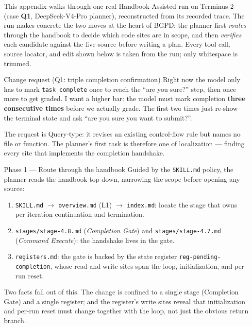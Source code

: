 \documentclass[]{ailab}
\newcommand{\code}[1]{\texttt{#1}}
\begin{document}
This appendix walks through one real Handbook-Assisted run on Terminus-2 (case
\textbf{Q1}, DeepSeek-V4-Pro planner), reconstructed from its recorded trace. The
run makes concrete the two moves at the heart of BGPD: the planner first
\emph{routes} through the handbook to decide which code sites are in scope, and
then \emph{verifies} each candidate against the live source before writing a
plan. Every tool call, source locator, and edit shown below is taken from the
run; only whitespace is trimmed.

\begin{casebox}{Change request (Q1: triple completion confirmation)}
Right now the model only has to mark \code{task\_complete} once to reach the
``are you sure?'' step, then once more to get graded. I want a higher bar: the
model must mark completion \textbf{three consecutive times} before we actually
grade. The first two times just re-show the terminal state and ask ``are you sure
you want to submit?''.
\end{casebox}

\noindent The request is Query-type: it revises an existing control-flow rule but
names no file or function. The planner's first task is therefore one of
localization --- finding every site that implements the completion handshake.

\begin{casebox}{Phase 1 --- Route through the handbook}
Guided by the \code{SKILL.md} policy, the planner reads the handbook top-down,
narrowing the scope before opening any source:
\begin{enumerate}[leftmargin=1.4em,itemsep=1pt,topsep=2pt]
  \item \code{SKILL.md} $\rightarrow$ \code{overview.md} (L1) $\rightarrow$
  \code{index.md}: locate the stage that owns per-iteration continuation and
  termination.
  \item \code{stages/stage-4.8.md} (\emph{Completion Gate}) and
  \code{stages/stage-4.7.md} (\emph{Command Execute}): the handshake lives in the
  gate.
  \item \code{registers.md}: the gate is backed by the state register
  \code{reg-pending-completion}, whose read and write sites span the loop,
  initialization, and per-run reset.
\end{enumerate}
Two facts fall out of this. The change is confined to a single stage (Completion
Gate) and a single register; and the register's write sites reveal that
initialization and per-run reset must change together with the loop, not just the
obvious return branch.
\end{casebox}
\end{document}

